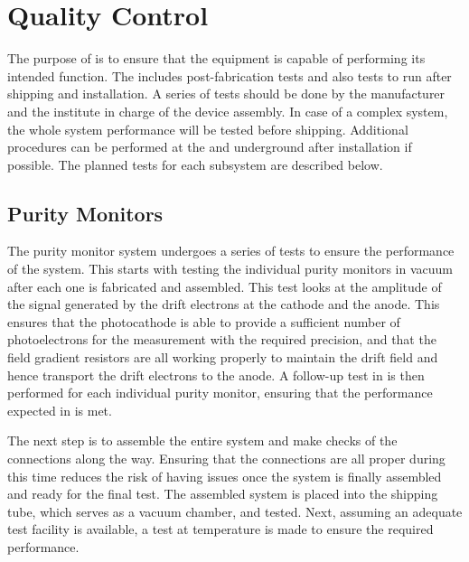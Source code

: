 \section{Quality Control}
\label{sec:fdgen-slow-cryo-qc}
The purpose of   is to ensure that the equipment is capable of performing its intended function. The  includes post-fabrication tests and also tests to run after shipping and installation. A series of tests should be done by the manufacturer and the institute in charge of the device assembly. In case of a complex system, the whole system performance will be tested before shipping. 
Additional  procedures can be performed at the  and underground after installation if possible. The planned tests for each subsystem are described below.  

\subsection{Purity Monitors}
\label{sec:fdgen-slow-cryo-qc-pm}

The purity monitor system undergoes a series of tests to ensure the performance of the system.  This  starts with testing the individual purity monitors in vacuum after each one is fabricated and assembled.  This test looks at the amplitude of the signal generated by the drift electrons at the cathode and the anode.  This ensures that the photocathode is able to provide a sufficient number of photoelectrons for the measurement %
with the required precision, and that the field gradient resistors are all working properly to maintain the drift field and hence transport the drift electrons to the anode.  A follow-up test in \lar is then performed for each individual purity monitor, ensuring that the performance expected in \lar is met.  

The next step %
is to assemble the entire system and make checks of the connections along the way.  Ensuring that the connections are all proper during this time reduces the risk of having issues once the system is finally assembled and ready for the final test.  %
The assembled system is placed into the shipping tube, which serves as a vacuum chamber, and tested. %
Next, assuming an adequate \lar test facility is available, a test at \lar temperature is made to ensure the required performance. 

